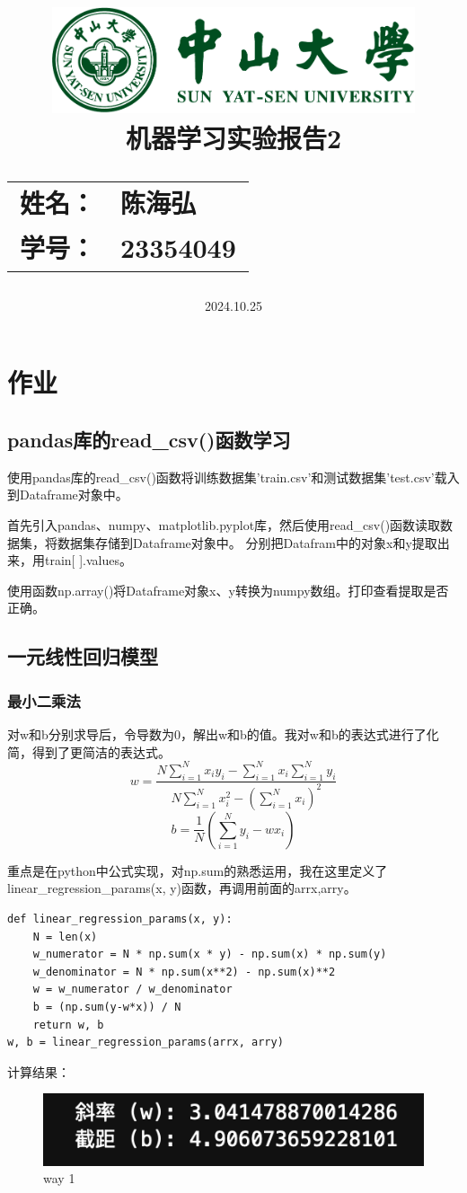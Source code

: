 \documentclass[12pt,a4paper,oneside]{article}
\title{
    \vspace*{-2cm} %
    \includegraphics[width=0.8\textwidth]{SYSULogo.pdf} \\[1em]
    \vfill %
    \LARGE \textbf{机器学习实验报告2} \\[1em]
    \Large
    \begin{tabular}{rl}
        \textbf{姓名：} & \textbf{陈海弘} \\
        \textbf{学号：} & \textbf{23354049}
    \end{tabular}
    \vfill %
}
\date{\Large 2024.10.25}
\begin{document}
\maketitle

\newpage
\tableofcontents
\newpage

\section{作业}
\subsection{pandas库的read\_csv()函数学习}

使用pandas库的read\_csv()函数将训练数据集'train.csv'和测试数据集'test.csv'载入到Dataframe对象中。

首先引入pandas、numpy、matplotlib.pyplot库，然后使用read\_csv()函数读取数据集，将数据集存储到Dataframe对象中。
分别把Datafram中的对象x和y提取出来，用train[ ].values。

使用函数np.array()将Dataframe对象x、y转换为numpy数组。打印查看提取是否正确。

\subsection{一元线性回归模型}
\subsubsection{最小二乘法}
对w和b分别求导后，令导数为0，解出w和b的值。我对w和b的表达式进行了化简，得到了更简洁的表达式。
\begin{equation}
    w = \frac{N \sum_{i=1}^{N} x_i y_i - \sum_{i=1}^{N} x_i \sum_{i=1}^{N} y_i}{N \sum_{i=1}^{N} x_i^2 - (\sum_{i=1}^{N} x_i)^2}
\end{equation}
\begin{equation}
    b = \frac{1}{N} \left( \sum_{i=1}^{N} y_i - wx_i \right)
\end{equation}

重点是在python中公式实现，对np.sum的熟悉运用，我在这里定义了linear\_regression\_params(x, y)函数，再调用前面的arrx,arry。
\begin{lstlisting}
def linear_regression_params(x, y):
    N = len(x)
    w_numerator = N * np.sum(x * y) - np.sum(x) * np.sum(y)
    w_denominator = N * np.sum(x**2) - np.sum(x)**2
    w = w_numerator / w_denominator
    b = (np.sum(y-w*x)) / N
    return w, b
w, b = linear_regression_params(arrx, arry)
    \end{lstlisting}
计算结果：
\begin{figure}[H]
    \centering
    \begin{minipage}[b]{0.3\textwidth}
        \centering
        \includegraphics[width=\textwidth]{1}
        \caption{way 1}
        \label{fig:code}
    \end{minipage}
\end{figure}
\end{document}
